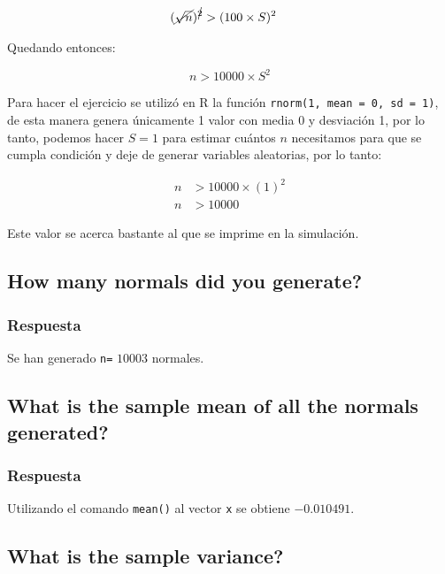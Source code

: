\documentclass[12pt]{article}\usepackage[]{graphicx}\usepackage[]{xcolor}
\begin{document}
\begin{align*}
  (\cancel{\sqrt{n}})^{\cancel{2}} &> (100 \times S)^{2} 
\end{align*}

Quedando entonces:

\[
n > 10000\times S^{2}
\]

Para hacer el ejercicio se utilizó en \textsf{R} la función \texttt{rnorm(1, mean = 0, sd = 1)}, de esta manera genera únicamente 1 valor con media 0 y desviación 1, por lo tanto, podemos hacer $S = 1$ para estimar cuántos $n$ necesitamos para que se cumpla condición y deje de generar variables aleatorias, por lo tanto:

\begin{align*}
  n &> 10000 \times (1)^{2} \\
  n &> 10000 
\end{align*}

Este valor se acerca bastante al que se imprime en la simulación. 











\subsection{How many normals did you generate?}
\label{subsec:p1-b}

\subsubsection{Respuesta}

Se han generado \lstinline|n=| $10003$ normales.


\subsection{What is the sample mean of all the normals generated?}
\label{subsec:p1-c}




\subsubsection{Respuesta}

Utilizando el comando \lstinline|mean()| al vector \lstinline|x| se obtiene $-0.010491$. 

\subsection{What is the sample variance?}
\label{subsec:p1-d}
\end{document}
